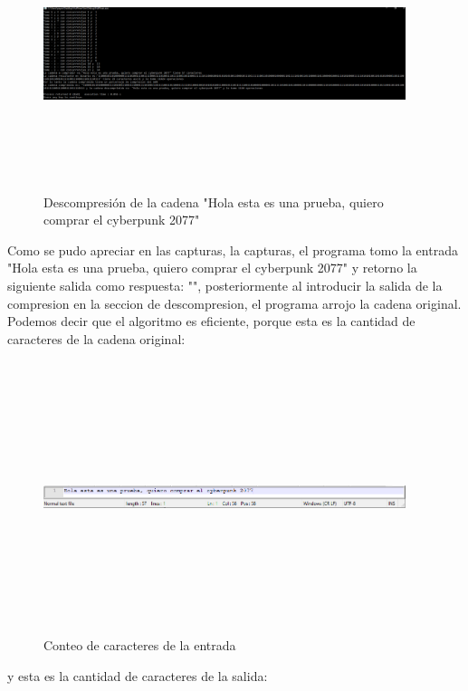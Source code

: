 \documentclass[spanish]{article}
\begin{document}
	\begin{figure}[H]
		\centering
		\includegraphics[width=400px,height=300px]{captura2}
		\caption{Descompresión  de la cadena "Hola esta es una prueba, quiero comprar el cyberpunk 2077"}
	\end{figure}
	Como se pudo apreciar en las capturas, la capturas, el programa tomo la entrada "Hola esta es una prueba, quiero comprar el cyberpunk 2077" y retorno la siguiente salida como respuesta: "", posteriormente al introducir la salida de la compresion en la seccion de descompresion, el programa arrojo la cadena original.
	Podemos decir que el algoritmo es eficiente, porque esta es la cantidad de caracteres de la cadena original:
	\begin{figure}[H]
		\centering
		\includegraphics[width=400px,height=300px]{captura3}
		\caption{Conteo de caracteres de la entrada}
	\end{figure}
	y esta es la cantidad de caracteres de la salida:
\end{document}
